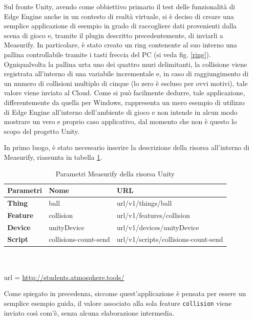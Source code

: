 Sul fronte Unity, avendo come obbiettivo primario il test delle funzionalità di Edge Engine anche in un contesto di realtà virtuale, si è deciso di creare una semplice applicazione di esempio in grado di raccogliere dati provenienti dalla scena di gioco e, tramite il plugin descritto precedentemente, di inviarli a Measurify. In particolare, è stato creato un ring contenente al suo interno una pallina controllabile tramite i tasti freccia del PC (si veda fig. \ref{ring}). Ogniqualvolta la pallina urta uno dei quattro muri delimitanti, la collisione viene registrata all'interno di una variabile incrementale e, in caso di raggiungimento di un numero di collisioni multiplo di cinque (lo zero è escluso per ovvi motivi), tale valore viene inviato al Cloud. Come si può facilmente dedurre, tale applicazione, differentemente da quella per Windows, rappresenta un mero esempio di utilizzo di Edge Engine all'interno dell'ambiente di gioco e non intende in alcun modo mostrare un vero e proprio caso applicativo, dal momento che non è questo lo scopo del progetto Unity.

In primo luogo, è stato necessario inserire la descrizione della risorsa all'interno di Measurify, riassunta in tabella \ref{descunitydev}.

\begin{table}[H]
	\begin{tabular}{|p{}|p{}|p{}|}
		\hline
		\textbf{Parametri} & \textbf{Nome} & \textbf{URL}\\
		\hline
		\textbf{Thing} & ball & {{url}}/v1/things/ball\\
		\hline
		\textbf{Feature} & collision & {{url}}/v1/features/collision\\
		\hline
		\textbf{Device} & unityDevice & {{url}}/v1/devices/unityDevice\\    
		\hline
		\textbf{Script} & collisions-count-send & {{url}}/v1/scripts/collisions-count-send\\    
		\hline
	\end{tabular}
	\\\\url = \url{http://students.atmosphere.tools/}
	\caption{Parametri Measurify della risorsa Unity}
	\label{descunitydev}
\end{table}

Come spiegato in precedenza, siccome quest'applicazione è pensata per essere un semplice esempio guida, il valore associato alla sola feature \texttt{collision} viene inviato così com'è, senza alcuna elaborazione intermedia.

